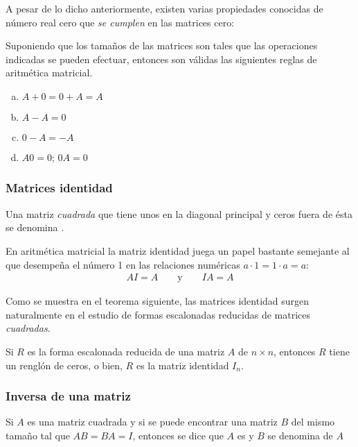 \documentclass[a4paper,12pt]{article}
\begin{document}
A pesar de lo dicho anteriormente, existen varias propiedades conocidas de
número real cero que \emph{se cumplen} en las matrices cero:
\begin{theorem}
  Suponiendo que los tamaños de las matrices son tales que las operaciones
  indicadas se pueden efectuar, entonces son válidas las siguientes reglas de
  aritmética matricial.
  \begin{enumerate}[(a)]
    \item $A+0=0+A=A$
    \item $A-A=0$
    \item $0-A=-A$
    \item $A0=0$; $0A=0$
  \end{enumerate}
  \label{theo:cero}
\end{theorem}

\subsubsection{Matrices identidad}

\begin{concept}
  Una matriz \textit{cuadrada} que tiene unos en la diagonal principal y ceros
  fuera de ésta se denomina .
\end{concept}

En aritmética matricial la matriz identidad juega un papel bastante semejante
al que desempeña el número 1 en las relaciones numéricas $a\cdot1=1\cdot a=a$:
\begin{align*}
  AI=A \qquad \mbox{y} \qquad IA=A
\end{align*}

Como se muestra en el teorema siguiente, las matrices identidad surgen
naturalmente en el estudio de formas escalonadas reducidas de matrices
\emph{cuadradas}.

\begin{theorem}
  Si $R$ es la forma escalonada reducida de una matriz $A$ de $n\times n$,
  entonces $R$ tiene un renglón de ceros, o bien, $R$ es la matriz identidad
  $I_n$.
  \label{theo:matriz_identidad}
\end{theorem}

\subsubsection{Inversa de una matriz}

\begin{concept}
  Si $A$ es una matriz cuadrada y si se puede encontrar una matriz $B$ del
  mismo tamaño tal que $AB=BA=I$, entonces se dice que $A$ es
   y $B$ se denomina  de $A$
\end{concept}
\end{document}
